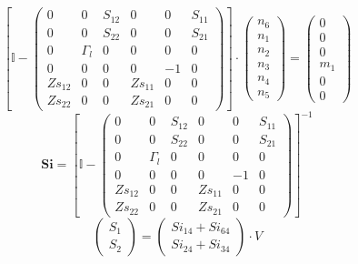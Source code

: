\[ \left[ \mathbb{I}  - \left(\begin{array}{cccccc} 0 & 0 & S_{12} & 0
& 0 & S_{11} \\ 0 & 0 & S_{22} & 0 & 0 & S_{21} \\ 0 & \Gamma_{l} & 0
& 0 & 0 & 0 \\ 0 & 0 & 0 & 0 & -1 & 0 \\ Zs_{12} & 0 & 0 & Zs_{11} & 0
& 0 \\ Zs_{22} & 0 & 0 & Zs_{21} & 0 & 0 \end{array}\right)\right]
\cdot \left(\begin{array}{c} n_{6} \\ n_{1} \\ n_{2} \\ n_{3} \\ n_{4}
\\ n_{5} \end{array}\right) = \left(\begin{array}{c} 0 \\ 0 \\ 0 \\
m_{1} \\ 0 \\ 0 \end{array}\right) \]
\[ \mathbf{Si} = \left[ \mathbb{I}  - \left(\begin{array}{cccccc} 0 &
0 & S_{12} & 0 & 0 & S_{11} \\ 0 & 0 & S_{22} & 0 & 0 & S_{21} \\ 0 &
\Gamma_{l} & 0 & 0 & 0 & 0 \\ 0 & 0 & 0 & 0 & -1 & 0 \\ Zs_{12} & 0 &
0 & Zs_{11} & 0 & 0 \\ Zs_{22} & 0 & 0 & Zs_{21} & 0 & 0
\end{array}\right) \right]^{-1} \]
\[ \left(\begin{array}{c} S_{1} \\ S_{2}
\end{array}\right)=\left(\begin{array}{c} Si_{14} + Si_{64} \\ Si_{24}
+ Si_{34} \end{array}\right)\cdot V \]

